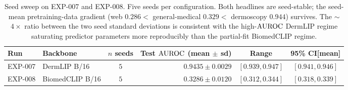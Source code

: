 \begin{table}[h]
\centering
\small
\setlength{\tabcolsep}{5pt}
\begin{tabular}{@{}llcrcc@{}}
\toprule
Run & Backbone & $n$ seeds & Test $\mathrm{AUROC}$ (mean $\pm$ sd) & Range & 95\% CI[mean] \\
\midrule
EXP-007 & DermLIP B/16    & $5$ & $0.9435 \pm 0.0029$ & $[0.939, 0.947]$ & $[0.941, 0.946]$ \\
EXP-008 & BiomedCLIP B/16 & $5$ & $0.3286 \pm 0.0120$ & $[0.312, 0.344]$ & $[0.318, 0.339]$ \\
\bottomrule
\end{tabular}
\caption{Seed sweep on EXP-007 and EXP-008. Five seeds per
configuration. Both headlines are seed-stable; the seed-mean
pretraining-data gradient (web $0.286 <$ general-medical $0.329 <$
dermoscopy $0.944$) survives. The $\sim$$4\times$ ratio between the two
seed standard deviations is consistent with the high-$\mathrm{AUROC}$ DermLIP
regime saturating predictor parameters more reproducibly than the
partial-fit BiomedCLIP regime.}
\label{tab:seed-sweep}
\end{table}
